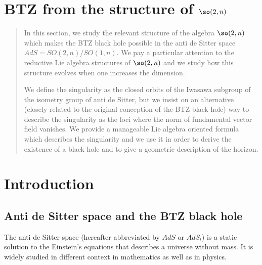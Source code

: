 
\section{BTZ from the structure of \texorpdfstring{$ \so(2,n)$}{so(2,n)}}

\begin{abstract}
	In this section, we study the relevant structure of the algebra $\so(2,n)$ which makes the BTZ black hole possible in the anti de Sitter space $AdS=SO(2,n)/SO(1,n)$. We pay a particular attention to the reductive Lie algebra structures of $\so(2,n)$ and we study how this structure evolves when one increases the dimension. 

	We define the singularity as the closed orbits of the Iwasawa subgroup of the isometry group of anti de Sitter, but we insist on an alternative (closely related to the original conception of the BTZ black hole) way to describe the singularity as the loci where the norm of fundamental vector field vanishes. We provide a manageable Lie algebra oriented formula which describes the singularity and we use it in order to derive the existence of a black hole and to give a geometric description of the horizon. 

\end{abstract}


\section{Introduction}
\label{LONGSecSumStructExist}

\subsection{Anti de Sitter space and the BTZ black hole}

The anti de Sitter space (hereafter abbreviated by $AdS$ or $AdS_l$) is a static solution to the Einstein's equations that describes a universe without mass. It is widely studied in different context in mathematics as well as in physics.

